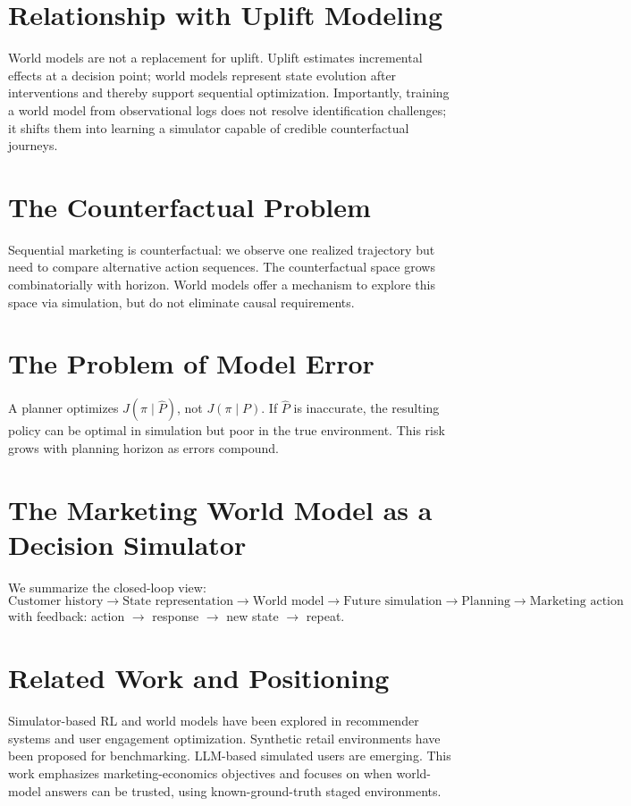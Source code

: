 \documentclass[11pt]{article}
\newcommand{\wm}{\hat{P}}
\newcommand{\gt}{P}
\begin{document}
\section{Relationship with Uplift Modeling}
World models are not a replacement for uplift. Uplift estimates incremental effects at a decision point; world models represent state evolution after interventions and thereby support sequential optimization. Importantly, training a world model from observational logs does not resolve identification challenges; it shifts them into learning a simulator capable of credible counterfactual journeys.

\section{The Counterfactual Problem}
Sequential marketing is counterfactual: we observe one realized trajectory but need to compare alternative action sequences. The counterfactual space grows combinatorially with horizon. World models offer a mechanism to explore this space via simulation, but do not eliminate causal requirements.

\section{The Problem of Model Error}
A planner optimizes $J(\pi\mid \wm)$, not $J(\pi\mid \gt)$. If $\wm$ is inaccurate, the resulting policy can be optimal in simulation but poor in the true environment. This risk grows with planning horizon as errors compound.

\section{The Marketing World Model as a Decision Simulator}
We summarize the closed-loop view:
\[
\text{Customer history} \rightarrow \text{State representation} \rightarrow \text{World model} \rightarrow \text{Future simulation} \rightarrow \text{Planning} \rightarrow \text{Marketing action}
\]
with feedback: action $\rightarrow$ response $\rightarrow$ new state $\rightarrow$ repeat.

\section{Related Work and Positioning}
Simulator-based RL and world models have been explored in recommender systems and user engagement optimization. Synthetic retail environments have been proposed for benchmarking. LLM-based simulated users are emerging. This work emphasizes marketing-economics objectives and focuses on when world-model answers can be trusted, using known-ground-truth staged environments.
\end{document}
